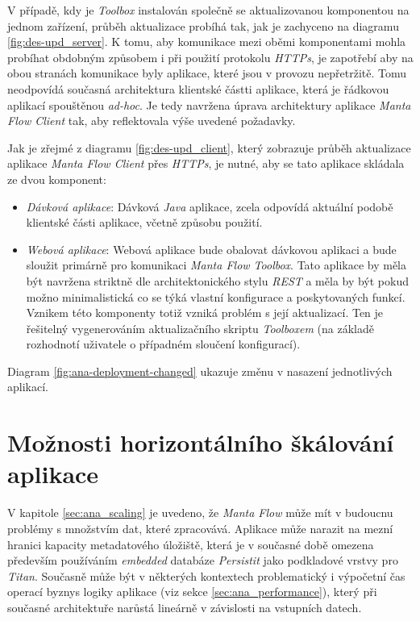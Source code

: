V případě, kdy je \textit{Toolbox} instalován společně se aktualizovanou komponentou na jednom zařízení, průběh aktualizace probíhá tak, jak je zachyceno na diagramu \ref{fig:des-upd_server}. K tomu, aby komunikace mezi oběmi komponentami mohla probíhat obdobným způsobem i při použití protokolu \textit{HTTPs}, je zapotřebí aby na obou stranách komunikace byly aplikace, které jsou v provozu nepřetržitě. Tomu neodpovídá současná architektura klientské částti aplikace, která je řádkovou aplikací spouštěnou \textit{ad-hoc}. Je tedy navržena úprava architektury aplikace \textit{Manta Flow Client} tak, aby reflektovala výše uvedené požadavky.

Jak je zřejmé z diagramu \ref{fig:des-upd_client}, který zobrazuje průběh aktualizace aplikace \textit{Manta Flow Client} přes \textit{HTTPs}, je nutné, aby se tato aplikace skládala ze dvou komponent:

\begin{itemize}
   \item{\textit{Dávková aplikace}}: Dávková \textit{Java} aplikace, zcela odpovídá aktuální podobě klientské části aplikace, včetně způsobu použití.
   \item{\textit{Webová aplikace}}: Webová aplikace bude obalovat dávkovou aplikaci a bude sloužit primárně pro komunikaci \textit{Manta Flow Toolbox}. Tato aplikace by měla být navržena striktně dle architektonického stylu \textit{REST} a měla by být pokud možno minimalistická co se týká vlastní konfigurace a poskytovaných funkcí. Vznikem této komponenty totiž vzniká problém s její aktualizací. Ten je řešitelný vygenerováním aktualizačního skriptu \textit{Toolboxem} (na základě rozhodnotí uživatele o případném sloučení konfigurací).
\end{itemize}

Diagram \ref{fig:ana-deployment-changed} ukazuje změnu v nasazení jednotlivých aplikací.


\section{Možnosti horizontálního škálování aplikace}
\label{sec:des_scaling}
V kapitole \ref{sec:ana_scaling} je uvedeno, že \textit{Manta Flow} může mít v budoucnu problémy s množstvím dat, které zpracovává. Aplikace může narazit na mezní hranici kapacity metadatového úložiště, která je v současné době omezena především používáním \textit{embedded} databáze \textit{Persistit} jako podkladové vrstvy pro \textit{Titan}. Současně může být v některých kontextech problematický i výpočetní čas operací byznys logiky aplikace (viz sekce \ref{sec:ana_performance}), který při současné architektuře narůstá lineárně v závislosti na vstupních datech.

